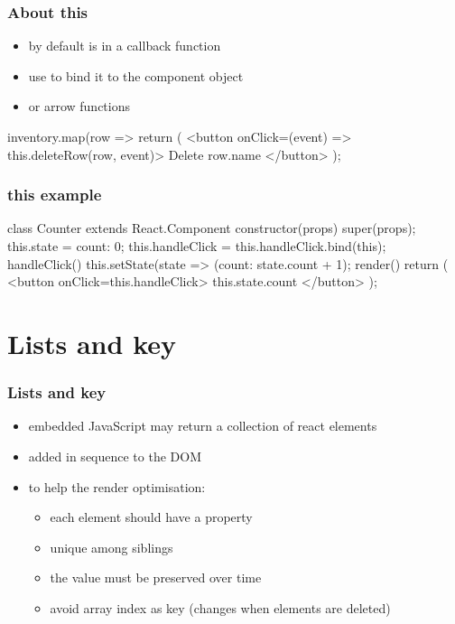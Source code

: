 \begin{frame}[fragile] \frametitle{About this}
\begin{itemize}
  \item by default  is  in a callback function
  \item use  to bind it to the component object
  \item or arrow functions
\end{itemize}
\begin{CodeBox}{}
inventory.map(row => { return (
    <button onClick={(event) => this.deleteRow(row, event)}>
      Delete {row.name}
    </button>
)};
\end{CodeBox}
\end{frame}
\begin{frame}[fragile] \frametitle{this example}
\begin{CodeBox}{}
class Counter extends React.Component {
  constructor(props) {
    super(props);
    this.state = {count: 0};
    this.handleClick = this.handleClick.bind(this);
  }
  handleClick() {
    this.setState(state => ({count: state.count + 1});
  }
  render() {
    return (
      <button onClick={this.handleClick}>
        {this.state.count}
      </button>
    );
  }
}
\end{CodeBox}
\end{frame}

\section{Lists and key}
\begin{frame}[fragile] \frametitle{Lists and key}
\begin{itemize}
  \item embedded JavaScript may return a collection of react elements
  \item added in sequence to the DOM
  \item to help the render optimisation:
  \begin{itemize}
    \item each element should have a  property
    \item unique among siblings
    \item the value must be preserved over time
    \item avoid array index as key (changes when elements are deleted)
  \end{itemize}
\end{itemize}
\end{frame}

